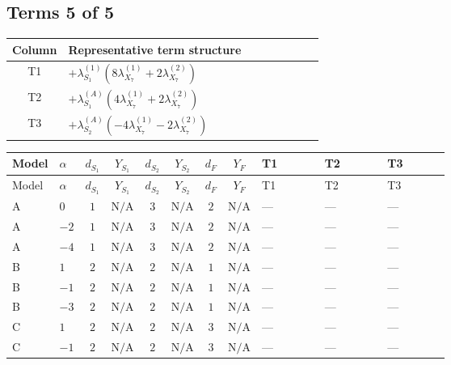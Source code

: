 \documentclass[8pt]{article}
\begin{document}
\begin{landscape}
\subsection*{Terms 5 of 5}
\begin{center}
\begin{tabular}{@{}c >{\raggedright\arraybackslash}p{0.82\linewidth}@{}}
\toprule
Column & Representative term structure \\
\midrule
T1 & \(\displaystyle +{\lambda_{S_1}^{(1)}} (8 {\lambda_{X_{7}}^{(1)}}+2 {\lambda_{X_{7}}^{(2)}})\) \\
\midrule
T2 & \(\displaystyle +{\lambda_{S_1}^{(A)}} (4 {\lambda_{X_{7}}^{(1)}}+2 {\lambda_{X_{7}}^{(2)}})\) \\
\midrule
T3 & \(\displaystyle +{\lambda_{S_2}^{(A)}} (-4 {\lambda_{X_{7}}^{(1)}}-2 {\lambda_{X_{7}}^{(2)}})\) \\
\midrule
\bottomrule
\end{tabular}
\end{center}
\smallskip
\tiny
\begin{longtable}{@{}llcccccc >{\raggedright\arraybackslash}p{0.21\linewidth} >{\raggedright\arraybackslash}p{0.21\linewidth} >{\raggedright\arraybackslash}p{0.21\linewidth}@{}}
\toprule
Model & $\alpha$ & $d_{S_1}$ & $Y_{S_1}$ & $d_{S_2}$ & $Y_{S_2}$ & $d_F$ & $Y_F$ & T1 & T2 & T3 \\
\midrule
\endfirsthead
\toprule
Model & $\alpha$ & $d_{S_1}$ & $Y_{S_1}$ & $d_{S_2}$ & $Y_{S_2}$ & $d_F$ & $Y_F$ & T1 & T2 & T3 \\
\midrule
\endhead
A & $0$ & $1$ & $\text{N/A}$ & $3$ & $\text{N/A}$ & $2$ & $\text{N/A}$ & --- & --- & --- \\
\midrule
A & $-2$ & $1$ & $\text{N/A}$ & $3$ & $\text{N/A}$ & $2$ & $\text{N/A}$ & --- & --- & --- \\
\midrule
A & $-4$ & $1$ & $\text{N/A}$ & $3$ & $\text{N/A}$ & $2$ & $\text{N/A}$ & --- & --- & --- \\
\midrule
B & $1$ & $2$ & $\text{N/A}$ & $2$ & $\text{N/A}$ & $1$ & $\text{N/A}$ & --- & --- & --- \\
\midrule
B & $-1$ & $2$ & $\text{N/A}$ & $2$ & $\text{N/A}$ & $1$ & $\text{N/A}$ & --- & --- & --- \\
\midrule
B & $-3$ & $2$ & $\text{N/A}$ & $2$ & $\text{N/A}$ & $1$ & $\text{N/A}$ & --- & --- & --- \\
\midrule
C & $1$ & $2$ & $\text{N/A}$ & $2$ & $\text{N/A}$ & $3$ & $\text{N/A}$ & --- & --- & --- \\
\midrule
C & $-1$ & $2$ & $\text{N/A}$ & $2$ & $\text{N/A}$ & $3$ & $\text{N/A}$ & --- & --- & --- \\

\end{longtable}
\end{landscape}
\end{document}

